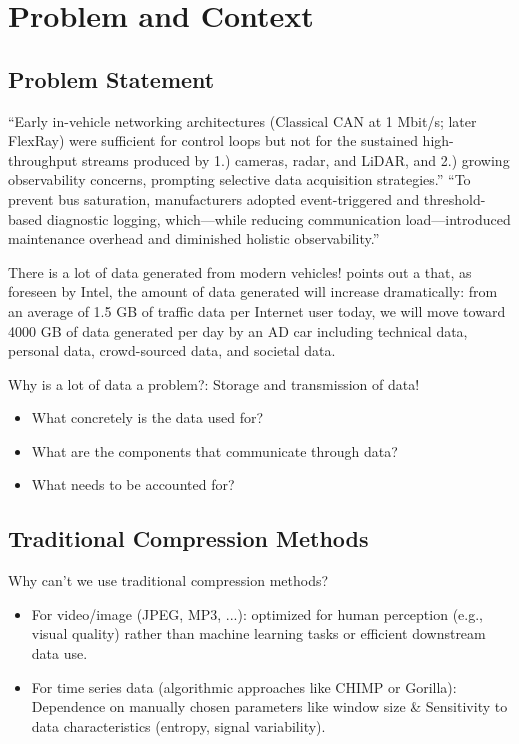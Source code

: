 \section{Problem and Context}
\subsection{Problem Statement}
“Early in-vehicle networking architectures (Classical CAN at 1 Mbit/s; later FlexRay) were sufficient for control loops but not for the sustained high-throughput streams produced by 1.) cameras, radar, and LiDAR, and 2.) growing observability concerns, prompting selective data acquisition strategies.” “To prevent bus saturation, manufacturers adopted event-triggered and threshold-based diagnostic logging, which—while reducing communication load—introduced maintenance overhead and diminished holistic observability.”

There is a lot of data generated from modern vehicles! \cite{bello2019advances} points out a that, as foreseen by Intel, the amount of data generated will increase dramatically: from an average of 1.5 GB of traffic data per Internet user today, we will move toward 4000 GB of data generated per day by an AD car including technical data, personal data, crowd-sourced data, and societal data.

Why is a lot of data a problem?: Storage and transmission of data!
\begin{itemize}
    \item What concretely is the data used for?
    \item What are the components that communicate through data? 
    \item What needs to be accounted for?    
\end{itemize}

\subsection{Traditional Compression Methods}
Why can't we use traditional compression methods?
\begin{itemize}
    \item For video/image (JPEG, MP3, ...): optimized for human perception (e.g., visual quality) rather than machine learning tasks or efficient downstream data use.
    \item For time series data (algorithmic approaches like CHIMP or Gorilla): Dependence on manually chosen parameters like window size \& Sensitivity to data characteristics (entropy, signal variability). 
\end{itemize}

